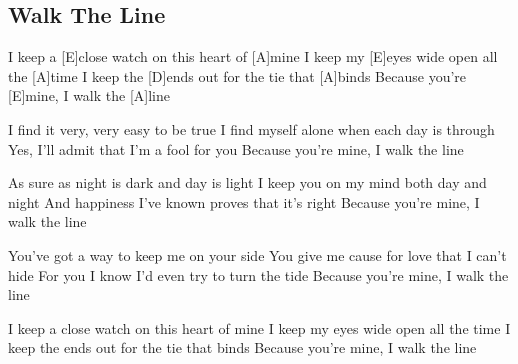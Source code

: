 \subsection*{Walk The Line   }



\begin{guitar}
[A]I keep a [E]close watch on this heart of [A]mine
I keep my [E]eyes wide open all the [A]time
I keep the [D]ends out for the tie that [A]binds
Because you're [E]mine, I walk the [A]line


I find it very, very easy to be true
I find myself alone when each day is through
Yes, I'll admit that I'm a fool for you
Because you're mine, I walk the line

As sure as night is dark and day is light
I keep you on my mind both day and night
And happiness I've known proves that it's right
Because you're mine, I walk the line

You've got a way to keep me on your side
You give me cause for love that I can't hide
For you I know I'd even try to turn the tide
Because you're mine, I walk the line

I keep a close watch on this heart of mine
I keep my eyes wide open all the time
I keep the ends out for the tie that binds
Because you're mine, I walk the line

\end{guitar}
